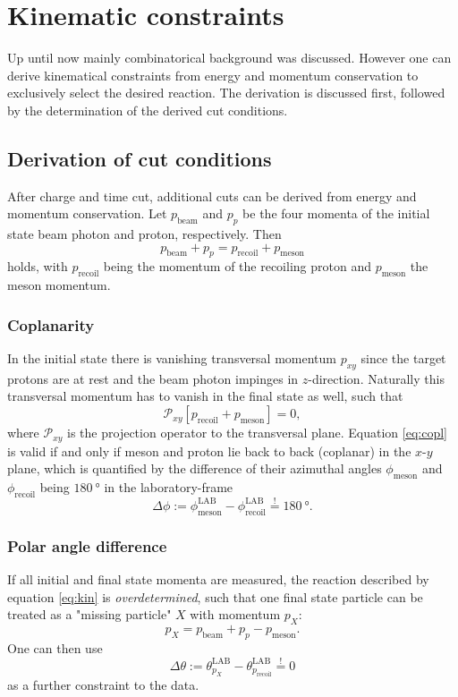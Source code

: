 \section{Kinematic constraints}
Up until now mainly combinatorical background was discussed. However one can derive kinematical constraints from energy and momentum conservation to exclusively select the desired reaction. The derivation is discussed first, followed by the determination of the derived cut conditions.
\subsection{Derivation of cut conditions}
After charge and time cut, additional cuts can be derived from energy and momentum conservation. Let $p_\text{beam}$ and $p_p$ be the four momenta of the initial state beam photon and proton, respectively. Then \begin{equation}
	p_\text{beam}+p_p=p_\text{recoil}+p_\text{meson}
	\label{eq:kin}
\end{equation}
holds, with $p_\text{recoil}$ being the momentum of the recoiling proton and $p_\text{meson}$ the meson momentum.
\subsubsection{Coplanarity}
In the initial state there is vanishing transversal momentum $p_{xy}$ since the target protons are at rest and the beam photon impinges in $z$-direction. Naturally this transversal momentum has to vanish in the final state as well, such that \begin{equation}
	\mathcal{P}_{xy} \left[p_\text{recoil}+p_\text{meson}\right]=0,
	\label{eq:copl}
\end{equation}
where $\mathcal{P}_{xy}$ is the projection operator to the transversal plane. Equation \eqref{eq:copl} is valid if and only if meson and proton lie back to back (coplanar) in the $x$-$y$ plane, which is quantified by the difference of their azimuthal angles $\phi_\text{meson}$ and $\phi_\text{recoil}$ being $\SI{180}{\degree}$ in the laboratory-frame
\begin{equation}
	\Delta\phi:=\phi_\text{meson}^\text{LAB}-\phi_\text{recoil}^\text{LAB}\overset{!}{=}\SI{180}{\degree}.
\end{equation}
\subsubsection{Polar angle difference}
If all initial and final state momenta are measured, the reaction described by equation \eqref{eq:kin} is \emph{overdetermined}, such that one final state particle can be treated as a "missing particle" $X$ with momentum $p_X$: 
\begin{equation}
	p_X=p_\text{beam}+p_p-p_\text{meson}.
	\label{eq:polangle}
\end{equation}
One can then use 
\begin{equation}
\Delta\theta:=\theta_{p_X}^\text{LAB}-\theta_{p_\text{recoil}}^\text{LAB}\overset{!}{=}0
\label{eq:polarangle}	
\end{equation}
as a further constraint to the data.

